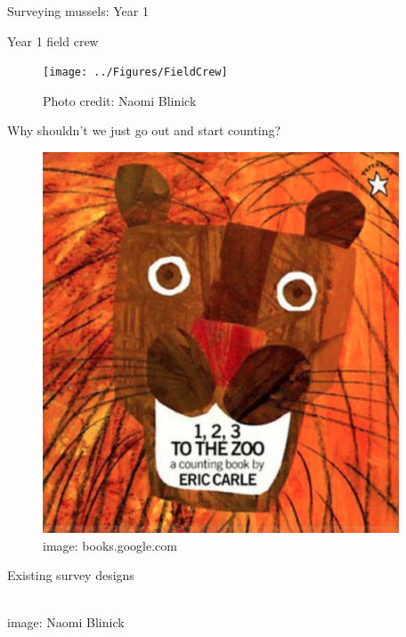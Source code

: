 \documentclass[ignorenonframetext,]{beamer}
\begin{document}
\begin{frame}{Surveying mussels: Year 1}
\protect\hypertarget{surveying-mussels-year-1}{}

\begin{block}{Year 1 field crew}

\begin{figure}

{\centering \texttt{[image: ../Figures/FieldCrew]} 

}

\caption{Photo credit: Naomi Blinick}\label{fig:unnamed-chunk-3}
\end{figure}

\end{block}

\begin{block}{Why shouldn't we just go out and start counting?}

\begin{figure}

{\centering \includegraphics[width=400px]{../Figures/123_zoo} 

}

\caption{image: books.google.com}\label{fig:unnamed-chunk-4}
\end{figure}

\end{block}

\begin{block}{Existing survey designs}

~\\
image: Naomi Blinick


\end{block}
\end{frame}
\end{document}
